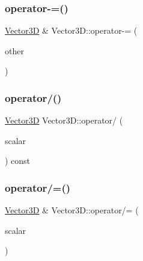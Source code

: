 \mbox{\label{classVector3D_a799f712590c47cc435b929718586555c}} 
\subsubsection{\texorpdfstring{operator-\/=()}{operator-=()}}
{\footnotesize\ttfamily \mbox{\hyperlink{classVector3D}{Vector3D}} \& Vector3\+D\+::operator-\/= (\begin{DoxyParamCaption}\item[{const \mbox{\hyperlink{classVector3D}{Vector3D}} \&}]{other }\end{DoxyParamCaption})}

\mbox{\label{classVector3D_a1cc502ec8678ad1b6655dba2b840642c}} 
\subsubsection{\texorpdfstring{operator/()}{operator/()}}
{\footnotesize\ttfamily \mbox{\hyperlink{classVector3D}{Vector3D}} Vector3\+D\+::operator/ (\begin{DoxyParamCaption}\item[{const double \&}]{scalar }\end{DoxyParamCaption}) const}

\mbox{\label{classVector3D_ac916f188b52f903688d475d8aa6c17fa}} 
\subsubsection{\texorpdfstring{operator/=()}{operator/=()}}
{\footnotesize\ttfamily \mbox{\hyperlink{classVector3D}{Vector3D}} \& Vector3\+D\+::operator/= (\begin{DoxyParamCaption}\item[{const double \&}]{scalar }\end{DoxyParamCaption})}

\mbox{\label{classVector3D_a4dcadc12bb40086b075c9559b78ed8d2}} 
